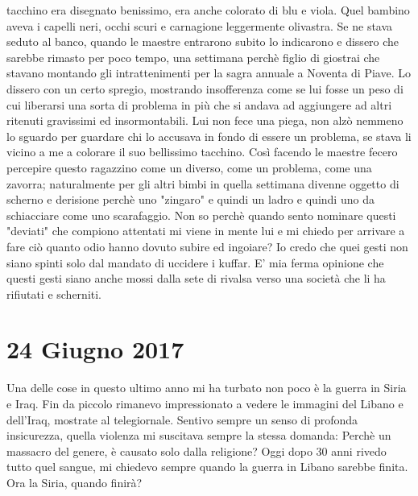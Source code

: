 tacchino era disegnato benissimo, era anche colorato di blu e
viola. Quel bambino aveva i capelli neri, occhi scuri e
carnagione leggermente olivastra. Se ne stava seduto al banco, quando
le maestre entrarono subito lo indicarono e dissero che sarebbe
rimasto per poco tempo, una settimana perchè figlio di giostrai che
stavano montando gli intrattenimenti per la sagra annuale a Noventa di
Piave. Lo dissero con un certo spregio, mostrando insofferenza come se
lui fosse un peso di cui liberarsi una sorta di problema in più che si
andava ad aggiungere ad altri ritenuti gravissimi ed
insormontabili. Lui non fece una piega, non alzò nemmeno lo sguardo
per guardare chi lo accusava in fondo di essere un problema, se stava
li vicino a me a colorare il suo bellissimo tacchino.\newline
Così facendo le maestre fecero percepire questo ragazzino come un
diverso, come un problema, come una zavorra; naturalmente per gli
altri bimbi in quella settimana divenne oggetto di scherno e derisione
perchè uno "zingaro" e quindi un ladro e quindi uno da schiacciare
come uno scarafaggio. Non so perchè quando sento nominare questi
"deviati" che compiono attentati mi viene in mente lui e mi chiedo per
arrivare a fare ciò quanto odio hanno dovuto subire ed ingoiare? Io
credo che quei gesti non siano spinti solo dal mandato di uccidere i
kuffar. E' mia ferma opinione che questi gesti siano anche mossi dalla
sete di rivalsa verso una società che li ha rifiutati e scherniti.

\section{24 Giugno 2017}
Una delle cose in questo ultimo anno mi ha turbato non poco è la guerra in Siria e Iraq. Fin da piccolo rimanevo impressionato a vedere le immagini del Libano e dell'Iraq, mostrate al telegiornale. Sentivo sempre un senso di profonda insicurezza, quella violenza mi suscitava sempre la stessa domanda: Perchè un massacro del genere, è causato solo dalla religione?
Oggi dopo 30 anni rivedo tutto quel sangue, mi chiedevo sempre quando la guerra in Libano sarebbe finita. Ora la Siria, quando finirà?

